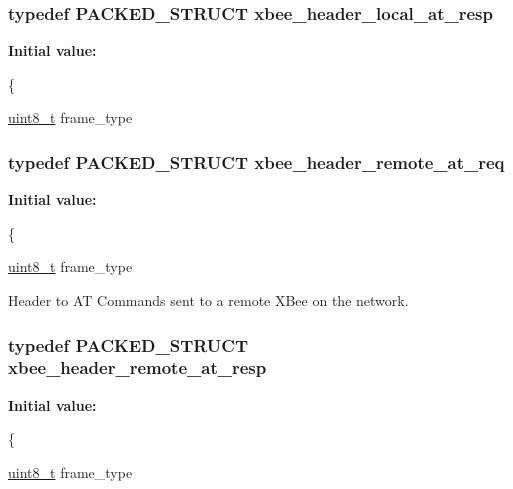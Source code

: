 \hypertarget{group__xbee__atcmd_ga99f105c39f52045b88bc1974fb520ed2}{
\subsubsection[{xbee\-\_\-header\-\_\-local\-\_\-at\-\_\-resp}]{\setlength{\rightskip}{0pt plus 5cm}typedef {\bf P\-A\-C\-K\-E\-D\-\_\-\-S\-T\-R\-U\-C\-T} xbee\-\_\-header\-\_\-local\-\_\-at\-\_\-resp}}\label{group__xbee__atcmd_ga99f105c39f52045b88bc1974fb520ed2}
{\bfseries Initial value\-:}
\begin{DoxyCode}
\{
   
   \hyperlink{group__hal_gae1affc9ca37cfb624959c866a73f83c2}{uint8\_t}          frame\_type
\end{DoxyCode}
\hypertarget{group__xbee__atcmd_gad9afb37256d642019ad00c6ec75eae05}{
\subsubsection[{xbee\-\_\-header\-\_\-remote\-\_\-at\-\_\-req}]{\setlength{\rightskip}{0pt plus 5cm}typedef {\bf P\-A\-C\-K\-E\-D\-\_\-\-S\-T\-R\-U\-C\-T} {\bf xbee\-\_\-header\-\_\-remote\-\_\-at\-\_\-req}}}\label{group__xbee__atcmd_gad9afb37256d642019ad00c6ec75eae05}
{\bfseries Initial value\-:}
\begin{DoxyCode}
\{
   
   \hyperlink{group__hal_gae1affc9ca37cfb624959c866a73f83c2}{uint8\_t}          frame\_type
\end{DoxyCode}


Header to A\-T Commands sent to a remote X\-Bee on the network. 

\hypertarget{group__xbee__atcmd_ga3f35810cc9e8761d8865f7f53f6ffa28}{
\subsubsection[{xbee\-\_\-header\-\_\-remote\-\_\-at\-\_\-resp}]{\setlength{\rightskip}{0pt plus 5cm}typedef {\bf P\-A\-C\-K\-E\-D\-\_\-\-S\-T\-R\-U\-C\-T} xbee\-\_\-header\-\_\-remote\-\_\-at\-\_\-resp}}\label{group__xbee__atcmd_ga3f35810cc9e8761d8865f7f53f6ffa28}
{\bfseries Initial value\-:}
\begin{DoxyCode}
\{
   
   \hyperlink{group__hal_gae1affc9ca37cfb624959c866a73f83c2}{uint8\_t}          frame\_type
\end{DoxyCode}


